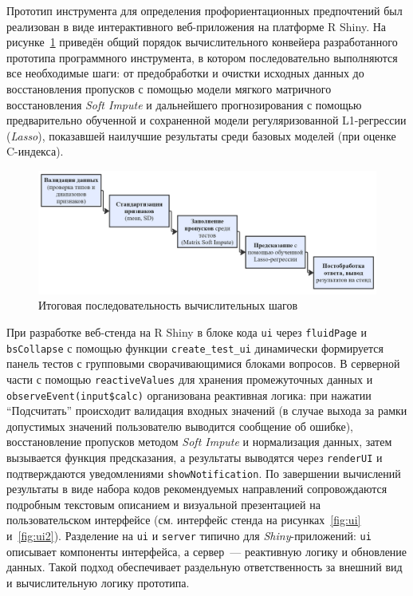 Прототип инструмента для определения профориентационных предпочтений был реализован в виде интерактивного веб-приложения на платформе R Shiny. На рисунке~\ref{fig:pipeline} приведён общий порядок вычислительного конвейера разработанного прототипа программного инструмента, в котором последовательно выполняются все необходимые шаги: от предобработки и очистки исходных данных до восстановления пропусков с помощью модели мягкого матричного восстановления \emph{Soft Impute} и дальнейшего прогнозирования с помощью предварительно обученной и сохраненной модели регуляризованной L1-регрессии (\emph{Lasso}), показавшей наилучшие результаты среди базовых моделей (при оценке C-индекса).

\begin{figure}[htbp]
    \centering
    \includegraphics[width=1.0\linewidth]{figures/final_pipeline.jpg}
    \caption{Итоговая последовательность вычислительных шагов}
    \label{fig:pipeline}
\end{figure}

При разработке веб-стенда на R Shiny в блоке кода \lstinline{ui} через \lstinline{fluidPage} и \lstinline{bsCollapse} с помощью функции \lstinline{create_test_ui} динамически формируется панель тестов с групповыми сворачивающимися блоками вопросов. В серверной части с помощью \lstinline{reactiveValues} для хранения промежуточных данных и \texttt{observeEvent(input\$calc)} организована реактивная логика: при нажатии \enquote{Подсчитать} происходит валидация входных значений (в случае выхода за рамки допустимых значений пользователю выводится сообщение об ошибке), восстановление пропусков методом \emph{Soft Impute} и нормализация данных, затем вызывается функция предсказания, а результаты выводятся через \lstinline{renderUI} и подтверждаются уведомлениями \lstinline{showNotification}. По завершении вычислений результаты в виде набора кодов рекомендуемых направлений сопровождаются подробным текстовым описанием и визуальной презентацией на пользовательском интерфейсе (см. интерфейс стенда на рисунках~\ref{fig:ui} и~\ref{fig:ui2}). Разделение на \lstinline{ui} и \lstinline{server} типично для \emph{Shiny}-приложений: \lstinline{ui} описывает компоненты интерфейса, а сервер~--- реактивную логику и обновление данных. Такой подход обеспечивает раздельную ответственность за внешний вид и вычислительную логику прототипа.

